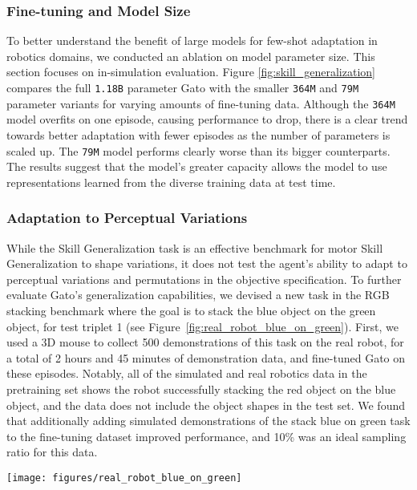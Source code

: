 \documentclass[10pt]{article} \usepackage[accepted]{tmlr}
\newcommand{\model}{{Gato}}
\begin{document}
\subsubsection*{Fine-tuning and Model Size}

To better understand the benefit of large models for few-shot adaptation in robotics domains, we conducted an ablation on model parameter size.
This section focuses on in-simulation evaluation.
Figure \ref{fig:skill_generalization} compares the full \texttt{1.18B} parameter \model{} with the smaller \texttt{364M} and \texttt{79M} parameter variants for varying amounts of fine-tuning data.
Although the \texttt{364M} model overfits on one episode, causing performance to drop, there is a clear trend towards better adaptation with fewer episodes as the number of parameters is scaled up.
The \texttt{79M} model performs clearly worse than its bigger counterparts.
The results suggest that the model's greater capacity allows the model to use representations learned from the diverse training data at test time.


\subsubsection*{Adaptation to Perceptual Variations}

While the Skill Generalization task is an effective benchmark for motor Skill Generalization to shape variations, it does not test the agent's ability to adapt to perceptual variations and permutations in the objective specification.
To further evaluate \model{}'s generalization capabilities, we devised a new task in the RGB stacking benchmark where the goal is to stack the blue object on the green object, for test triplet 1 (see Figure~\ref{fig:real_robot_blue_on_green}).
First, we used a 3D mouse to collect 500 demonstrations of this task on the real robot, for a total of 2 hours and 45 minutes of demonstration data, and fine-tuned \model{} on these episodes.
Notably, all of the simulated and real robotics data in the pretraining set shows the robot successfully stacking the red object on the blue object, and the data does not include the object shapes in the test set.
We found that additionally adding simulated demonstrations of the stack blue on green task to the fine-tuning dataset improved performance, and 10\% was an ideal sampling ratio for this data.
\begin{figure*}
    \centering
    \texttt{[image: figures/real\_robot\_blue\_on\_green]}    
    \caption{
    {\bf Comparing training/test task goal variations.}
    Top: the standard ``stack red on blue'' task tested in the Skill Generalization benchmark. Bottom: the novel ``stack blue on green'' task demonstrating \model{}'s out of distribution adaptation to perceptual variations.
    \label{fig:real_robot_blue_on_green}}
\end{figure*}
\end{document}
